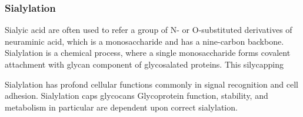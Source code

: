 \subsubsection {Sialylation}
Sialyic acid are often used to refer a group of N- or O-substituted derivatives of neuraminic acid, which is a monosaccharide and has a nine-carbon backbone.~\cite{Vocadlo_2009} Sialylation is a chemical process, where a single monosaccharide forms covalent attachment with glycan component of glycosalated proteins. This silycapping 

Sialylation has profond cellular functions commonly in signal recognition and cell adhesion. Sialylation caps glycocans Glycoprotein function, stability, and metabolism in particular are dependent upon correct sialylation.
